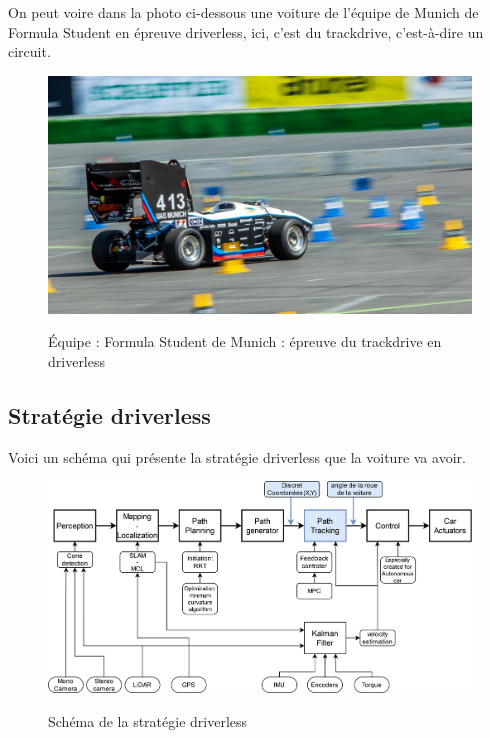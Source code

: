 \documentclass[a4paper,12pt]{extarticle}
\begin{document}
On peut voire dans la photo ci-dessous une voiture de l'équipe de Munich de Formula Student en épreuve driverless, ici, c'est du trackdrive, c'est-à-dire un circuit.

\begin{figure}[h]
    \centering
    \includegraphics[width=1\textwidth]{image/Racing-car-municHMotorsport-web_W071ZDE.jpg}\\
    \caption*{Équipe : Formula Student de Munich : épreuve du trackdrive en driverless}
\end{figure}

\pagebreak

\subsection{Stratégie driverless}
Voici un schéma qui présente la stratégie driverless que la voiture va avoir.

\begin{figure}[h]
    \centering
    \includegraphics[width=1\textwidth]{image/driverless_strategy.png}\\
    \caption*{Schéma de la stratégie driverless}
\end{figure}
\end{document}
